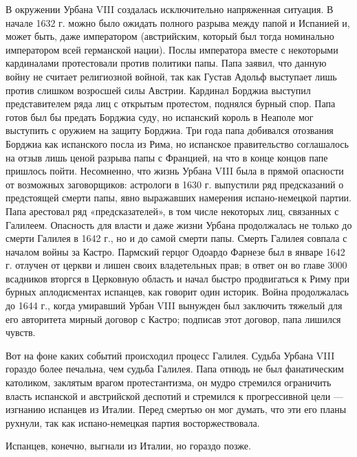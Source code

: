 В окружении Урбана VIII создалась исключительно напряженная ситуация. В начале
1632 г. можно было ожидать полного разрыва между папой и Испанией и, может
быть, даже императором (австрийским, который был тогда номинально императором
всей германской
нации). Послы императора вместе с некоторыми кардиналами протестовали против
политики папы. Папа заявил, что данную войну не считает религиозной войной, так
как Густав Адольф выступает лишь против слишком возросшей силы Австрии.
Кардинал Борджиа выступил представителем ряда лиц с открытым протестом,
поднялся бурный спор. Папа готов был бы предать Борджиа суду, но испанский
король в Неаполе мог выступить с оружием на защиту Борджиа. Три года папа
добивался отозвания Борджиа как испанского посла из Рима, но испанское
правительство соглашалось на отзыв лишь ценой разрыва папы с Францией, на что в
конце концов папе пришлось пойти. Несомненно, что жизнь Урбана VIII была в
прямой опасности от возможных заговорщиков: астрологи в 1630 г. выпустили ряд
предсказаний о предстоящей смерти папы, явно выражавших намерения
испано-немецкой партии. Папа арестовал ряд «предсказателей», в том числе
некоторых лиц, связанных с Галилеем. Опасность для власти и даже жизни Урбана
продолжалась не только до смерти Галилея в 1642 г., но и до самой смерти папы.
Смерть Галилея совпала с началом войны за Кастро. Пармский герцог Одоардо
Фарнезе был в январе 1642 г. отлучен от церкви и лишен своих владетельных прав;
в ответ он во главе 3000 всадников вторгся в Церковную область и начал быстро
продвигаться к Риму при бурных аплодисментах испанцев, как говорит один
историк. Война продолжалась до 1644 г., когда умиравший Урбан VIII вынужден был
заключить тяжелый для его авторитета мирный договор с Кастро; подписав этот
договор, папа лишился чувств.

Вот на фоне каких событий происходил процесс Галилея. Судьба Урбана VIII
гораздо более печальна, чем судьба Галилея. Папа отнюдь не был фанатическим
католиком, заклятым врагом протестантизма, он мудро стремился ограничить власть
испанской и австрийской деспотий и стремился к прогрессивной цели --- изгнанию
испанцев из Италии. Перед смертью он мог думать, что эти его планы рухнули, так
как испано-немецкая партия восторжествовала.

Испанцев, конечно, выгнали из Италии, но гораздо позже.

